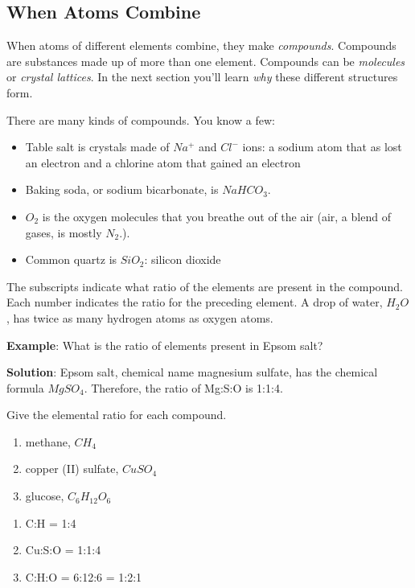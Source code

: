 \subsection{When Atoms Combine}
When atoms of different elements combine, they make \textit{compounds}. Compounds
are substances made up of more than one element. Compounds can be 
\textit{molecules} or \textit{crystal lattices}. In the next section you'll learn
\textit{why} these different structures form. 

There are many kinds of compounds. You know a few:
\begin{itemize}
\item Table salt is crystals made of $Na^{+}$ and $Cl^{-}$ ions: a sodium atom 
that as lost an electron and a chlorine atom that gained an electron
\item Baking soda, or sodium bicarbonate, is $NaHCO_3$.
\item $O_2$ is the oxygen molecules that you breathe out of the air (air, a
blend of gases, is mostly $N_2$.).
\item Common quartz is $SiO_2$: silicon dioxide
\end{itemize}

The subscripts indicate what ratio of the elements are present in the compound. 
Each number indicates the ratio for the preceding element. A drop of water, 
$H_2O$, has twice as many hydrogen atoms as oxygen atoms. 

\textbf{Example}: What is the ratio of elements present in Epsom salt?

\textbf{Solution}: Epsom salt, chemical name magnesium sulfate, has the chemical formula $MgSO_4$. Therefore, the ratio of Mg:S:O is 1:1:4. 

\begin{Exercise}[title = {Ratios of Atoms in Molecules}, label = num_atom]
Give the elemental ratio for each compound. 
\begin{enumerate}
\item methane, $CH_4$
\item copper (II) sulfate, $CuSO_4$
\item glucose, $C_6H_{12}O_6$
\end{enumerate}
\end{Exercise}

\begin{Answer}[ref = num_atom]
\begin{enumerate}
\item C:H = 1:4
\item Cu:S:O = 1:1:4
\item C:H:O = 6:12:6 = 1:2:1
\end{enumerate}
\end{Answer}

